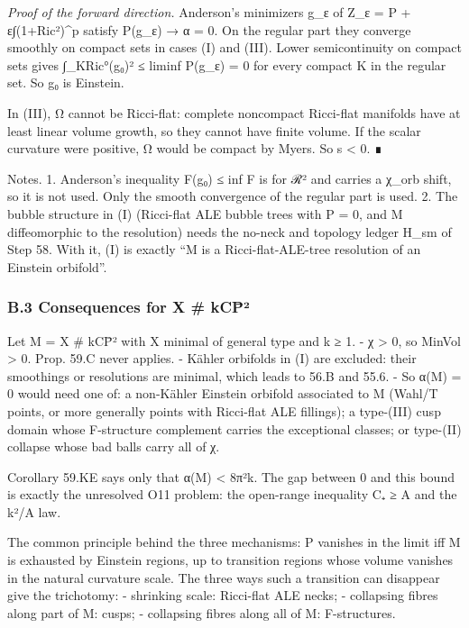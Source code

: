 \documentclass[
  10pt,
]{report}
\begin{document}
\emph{Proof of the forward direction.} Anderson's minimizers g\_ε of
Z\_ε = P + ε∫(1+\textbar Ric\textbar²)\^{}p satisfy P(g\_ε) → α = 0. On
the regular part they converge smoothly on compact sets in cases (I) and
(III). Lower semicontinuity on compact sets gives
∫\_K\textbar Ric°(g₀)\textbar² ≤ liminf P(g\_ε) = 0 for every compact K
in the regular set. So g₀ is Einstein.

In (III), Ω cannot be Ricci-flat: complete noncompact Ricci-flat
manifolds have at least linear volume growth, so they cannot have finite
volume. If the scalar curvature were positive, Ω would be compact by
Myers. So s \textless{} 0. ∎

Notes. 1. Anderson's inequality F(g₀) ≤ inf F is for ℛ² and carries a
χ\_orb shift, so it is not used. Only the smooth convergence of the
regular part is used. 2. The bubble structure in (I) (Ricci-flat ALE
bubble trees with P = 0, and M diffeomorphic to the resolution) needs
the no-neck and topology ledger H\_sm of Step 58. With it, (I) is
exactly ``M is a Ricci-flat-ALE-tree resolution of an Einstein
orbifold''.

\hypertarget{b.3-consequences-for-x-kcpuxb2}{%
\subsubsection{B.3 Consequences for X \#
kCP̄²}\label{b.3-consequences-for-x-kcpuxb2}}

Let M = X \# kCP̄² with X minimal of general type and k ≥ 1. - χ
\textgreater{} 0, so MinVol \textgreater{} 0. Prop. 59.C never applies.
- Kähler orbifolds in (I) are excluded: their smoothings or resolutions
are minimal, which leads to 56.B and 55.6. - So α(M) = 0 would need one
of: a non-Kähler Einstein orbifold associated to M (Wahl/T points, or
more generally points with Ricci-flat ALE fillings); a type-(III) cusp
domain whose F-structure complement carries the exceptional classes; or
type-(II) collapse whose bad balls carry all of χ.

Corollary 59.KE says only that α(M) \textless{} 8π²k. The gap between 0
and this bound is exactly the unresolved O11 problem: the open-range
inequality C₊ ≥ A and the k²/A law.

The common principle behind the three mechanisms: P vanishes in the
limit iff M is exhausted by Einstein regions, up to transition regions
whose volume vanishes in the natural curvature scale. The three ways
such a transition can disappear give the trichotomy: - shrinking scale:
Ricci-flat ALE necks; - collapsing fibres along part of M: cusps; -
collapsing fibres along all of M: F-structures.
\end{document}
